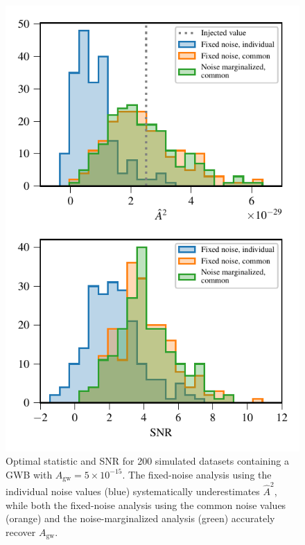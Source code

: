 \documentclass[twocolumn,aps,prd,superscriptaddress]{revtex4-1}
\newcommand{\Agw}{\ensuremath{A_\mathrm{gw}}}
\begin{document}
\begin{figure}[tb]
	\includegraphics[width=0.9\columnwidth]{plots/optstat_A5e-15.pdf}
	\caption{Optimal statistic and SNR for 200 simulated datasets 
			containing a GWB with $\Agw = 5\times10^{-15}$. 
			The fixed-noise analysis using the individual noise values (blue) 
			systematically underestimates $\hat{A}^2$, while both the 
			fixed-noise analysis using the common noise values (orange) 
			and the noise-marginalized analysis (green) 
			accurately recover $\Agw$.}
	\label{fig:os_datasetstats}
\end{figure}
\end{document}
